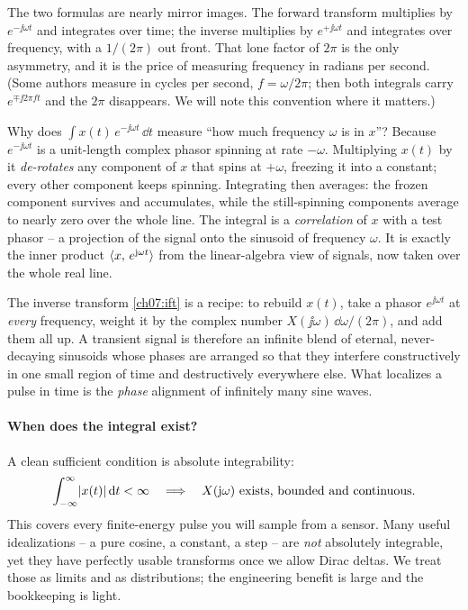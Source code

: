 The two formulas are nearly mirror images. The forward transform multiplies by
$e^{-\jj\omega t}$ and integrates over time; the inverse multiplies by $e^{+\jj\omega t}$
and integrates over frequency, with a $1/(2\pi)$ out front. That lone factor of $2\pi$
is the only asymmetry, and it is the price of measuring frequency in radians per second.
(Some authors measure in cycles per second, $f = \omega/2\pi$; then both integrals carry
$e^{\mp \jj 2\pi f t}$ and the $2\pi$ disappears. We will note this convention where it
matters.)

\begin{whybox}
Why does $\int x(t)\,e^{-\jj\omega t}\,\dd t$ measure ``how much frequency $\omega$ is in
$x$''? Because $e^{-\jj\omega t}$ is a unit-length complex phasor spinning at rate
$-\omega$. Multiplying $x(t)$ by it \emph{de-rotates} any component of $x$ that spins at
$+\omega$, freezing it into a constant; every other component keeps spinning. Integrating
then averages: the frozen component survives and accumulates, while the still-spinning
components average to nearly zero over the whole line. The integral is a
\emph{correlation} of $x$ with a test phasor -- a projection of the signal onto the
sinusoid of frequency $\omega$. It is exactly the inner product
$\langle x,\, e^{\mathrm{j}\omega t} \rangle$ from the linear-algebra view of signals, now taken over the
whole real line.
\end{whybox}

\begin{happeningbox}
The inverse transform \eqref{ch07:ift} is a recipe: to rebuild $x(t)$, take a phasor
$e^{\jj\omega t}$ at \emph{every} frequency, weight it by the complex number
$X(\jj\omega)\,\dd\omega/(2\pi)$, and add them all up. A transient signal is therefore
an infinite blend of eternal, never-decaying sinusoids whose phases are arranged so that
they interfere constructively in one small region of time and destructively everywhere
else. What localizes a pulse in time is the \emph{phase} alignment of infinitely
many sine waves.
\end{happeningbox}

\paragraph{When does the integral exist?}
A clean sufficient condition is absolute integrability:
\begin{equation}
\int_{-\infty}^{\infty} \lvert x(t)\rvert\, \mathrm{d} t < \infty
\quad\Longrightarrow\quad X(\mathrm{j}\omega) \text{ exists, bounded and continuous.}
\end{equation}
This covers every finite-energy pulse you will sample from a sensor. Many
useful idealizations -- a pure cosine, a constant, a step -- are \emph{not} absolutely
integrable, yet they have perfectly usable transforms once we allow Dirac deltas. We
treat those as limits and as distributions; the engineering benefit is large and the
bookkeeping is light.

